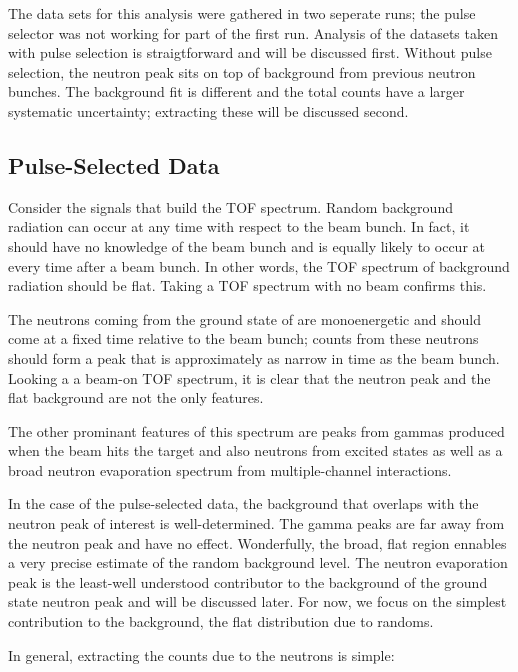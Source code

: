The data sets for this analysis were gathered in two seperate runs; the pulse selector was not working for part of the first run.  Analysis of the datasets taken with pulse selection is straigtforward and will be discussed first.  Without pulse selection, the neutron peak sits on top of background from previous neutron bunches.  The background fit is different and the total counts have a larger systematic uncertainty; extracting these will be discussed second.

\subsection{Pulse-Selected Data}
Consider the signals that build the TOF spectrum.  Random background radiation can occur at any time with respect to the beam bunch.  In fact, it should have no knowledge of the beam bunch and is equally likely to occur at every time after a beam bunch.  In other words, the TOF spectrum of background radiation should be flat.  Taking a TOF spectrum with no beam confirms this.


The neutrons coming from the ground state of  are monoenergetic and should come at a fixed time relative to the beam bunch; counts from these neutrons should form a peak that is approximately as narrow in time as the beam bunch.  Looking a a beam-on TOF spectrum, it is clear that the neutron peak and the flat background are not the only features.


The other prominant features of this spectrum are peaks from gammas produced when the beam hits the target and also neutrons from excited states as well as a broad neutron evaporation spectrum from multiple-channel interactions.

In the case of the pulse-selected data, the background that overlaps with the neutron peak of interest is well-determined.  The gamma peaks are far away from the neutron peak and have no effect.  Wonderfully, the broad, flat region ennables a very precise estimate of the random background level.  The neutron evaporation peak is the least-well understood contributor to the background of the ground state neutron peak and will be discussed later.  For now, we focus on the simplest contribution to the background, the flat distribution due to randoms.

In general, extracting the counts due to the neutrons is simple:

